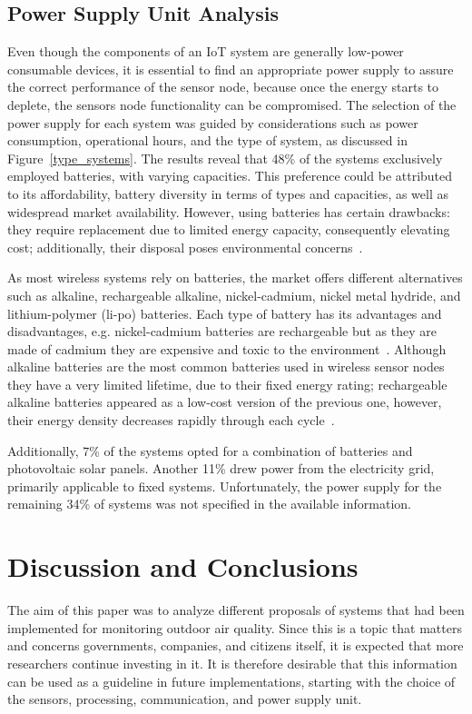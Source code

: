 \documentclass[10pt]{../imeko_acta}
\begin{document}
\subsection{Power Supply Unit Analysis}\label{PSUA}
Even though the components of an IoT system are generally low-power consumable devices, it is essential to find an appropriate power supply to assure the correct performance of the sensor node, because once the energy starts to deplete, the sensors node functionality can be compromised. The selection of the power supply for each system was guided by considerations  such as power consumption, operational hours, and the type of system, as discussed in Figure~\ref{type_systems}. The results reveal that 48\% of the systems exclusively employed batteries, with varying capacities. This preference could be attributed to its affordability, battery diversity in terms of types and capacities, as well as widespread market availability. However, using batteries has certain drawbacks: they require replacement due to limited energy capacity, consequently elevating cost; additionally, their disposal poses environmental concerns~\cite{somov2015powering}. 

As most wireless systems rely on batteries, the market offers different alternatives such as alkaline, rechargeable alkaline, nickel-cadmium, nickel metal hydride, and lithium-polymer (li-po) batteries. Each type of battery has its advantages and disadvantages, e.g. nickel-cadmium batteries are rechargeable but as they are made of cadmium they are expensive and toxic to the environment~\cite{wenqi2014power}. Although alkaline batteries are the most common batteries used in wireless sensor nodes they have a very limited lifetime, due to their fixed energy rating; rechargeable alkaline batteries appeared as a low-cost version of the previous one, however, their energy density decreases rapidly through each cycle~\cite{wenqi2014power}.  

Additionally, 7\% of the systems opted for a combination of batteries and photovoltaic solar panels. Another 11\% drew power from the electricity grid, primarily applicable to fixed systems. Unfortunately, the power supply for the remaining 34\% of systems was not specified in the available information.

\section{Discussion and Conclusions}

The aim of this paper was to analyze different proposals of systems that had been implemented for monitoring outdoor air quality. Since this is a topic that matters and concerns governments, companies, and citizens itself, it is expected that more researchers continue investing in it. It is therefore desirable that this information can be used as a guideline in future implementations, starting with the choice of the sensors, processing, communication, and power supply unit. 
\end{document}
